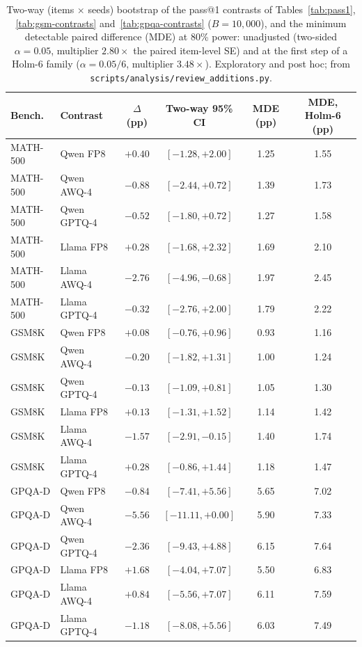 \documentclass[11pt,a4paper]{article}
\begin{document}
\begin{table}[t]
\centering
\caption{Two-way (items $\times$ seeds) bootstrap of the pass@1 contrasts of Tables~\ref{tab:pass1}, \ref{tab:gsm-contrasts} and~\ref{tab:gpqa-contrasts} ($B=10{,}000$), and the minimum detectable paired difference (MDE) at 80\% power: unadjusted (two-sided $\alpha=0.05$, multiplier $2.80\times$ the paired item-level SE) and at the first step of a Holm-6 family ($\alpha=0.05/6$, multiplier $3.48\times$). Exploratory and post hoc; from \texttt{scripts/analysis/review\_additions.py}.}
\label{tab:twoway}
\small
\setlength{\tabcolsep}{4pt}
\begin{tabular}{llcccc}
\toprule
\textbf{Bench.} & \textbf{Contrast} & $\Delta$ (pp) & \textbf{Two-way 95\% CI} & \textbf{MDE (pp)} & \textbf{MDE, Holm-6 (pp)} \\
\midrule
MATH-500 & Qwen FP8 & $+0.40$ & $[-1.28,+2.00]$ & 1.25 & 1.55 \\
MATH-500 & Qwen AWQ-4 & $-0.88$ & $[-2.44,+0.72]$ & 1.39 & 1.73 \\
MATH-500 & Qwen GPTQ-4 & $-0.52$ & $[-1.80,+0.72]$ & 1.27 & 1.58 \\
MATH-500 & Llama FP8 & $+0.28$ & $[-1.68,+2.32]$ & 1.69 & 2.10 \\
MATH-500 & Llama AWQ-4 & $-2.76$ & $[-4.96,-0.68]$ & 1.97 & 2.45 \\
MATH-500 & Llama GPTQ-4 & $-0.32$ & $[-2.76,+2.00]$ & 1.79 & 2.22 \\
\midrule
GSM8K & Qwen FP8 & $+0.08$ & $[-0.76,+0.96]$ & 0.93 & 1.16 \\
GSM8K & Qwen AWQ-4 & $-0.20$ & $[-1.82,+1.31]$ & 1.00 & 1.24 \\
GSM8K & Qwen GPTQ-4 & $-0.13$ & $[-1.09,+0.81]$ & 1.05 & 1.30 \\
GSM8K & Llama FP8 & $+0.13$ & $[-1.31,+1.52]$ & 1.14 & 1.42 \\
GSM8K & Llama AWQ-4 & $-1.57$ & $[-2.91,-0.15]$ & 1.40 & 1.74 \\
GSM8K & Llama GPTQ-4 & $+0.28$ & $[-0.86,+1.44]$ & 1.18 & 1.47 \\
\midrule
GPQA-D & Qwen FP8 & $-0.84$ & $[-7.41,+5.56]$ & 5.65 & 7.02 \\
GPQA-D & Qwen AWQ-4 & $-5.56$ & $[-11.11,+0.00]$ & 5.90 & 7.33 \\
GPQA-D & Qwen GPTQ-4 & $-2.36$ & $[-9.43,+4.88]$ & 6.15 & 7.64 \\
GPQA-D & Llama FP8 & $+1.68$ & $[-4.04,+7.07]$ & 5.50 & 6.83 \\
GPQA-D & Llama AWQ-4 & $+0.84$ & $[-5.56,+7.07]$ & 6.11 & 7.59 \\
GPQA-D & Llama GPTQ-4 & $-1.18$ & $[-8.08,+5.56]$ & 6.03 & 7.49 \\
\bottomrule
\end{tabular}
\end{table}
\end{document}
